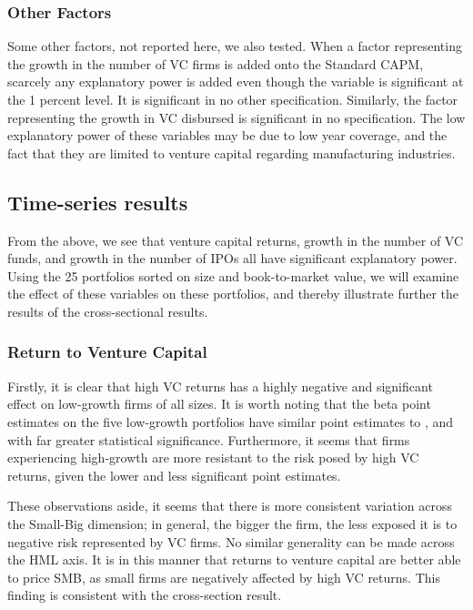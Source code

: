 \documentclass[12pt]{article}
\begin{document}
	\subsubsection{Other Factors} 

	Some other factors, not reported here, we also tested. When a factor representing the growth in the number of VC firms is added onto the Standard CAPM,  scarcely any explanatory power is added even though the variable is significant at the 1 percent level. It is significant in no other specification. Similarly, the factor representing the growth in VC disbursed is significant in no specification. The low explanatory power of these variables may be due to low year coverage, and the fact that they are limited to venture capital regarding manufacturing industries.

\subsection{Time-series results}

From the above, we see that venture capital returns, growth in the number of VC funds, and growth in the number of IPOs all have significant explanatory power. Using the 25 portfolios sorted on size and book-to-market value, we will examine the effect of these variables on these portfolios, and thereby illustrate further the results of the cross-sectional results.

	\subsubsection{Return to Venture Capital}
	
	Firstly, it is clear that high VC returns has a highly negative and significant effect on low-growth firms of all sizes. It is worth noting that the beta point estimates on the five low-growth portfolios have similar point estimates to \cite{grammig2010}, and with far greater statistical significance. Furthermore, it seems that firms experiencing high-growth are more resistant to the risk posed by high VC returns, given the lower and less significant point estimates.

These observations aside, it seems that there is more consistent variation across the Small-Big dimension; in general, the bigger the firm, the less exposed it is to negative risk represented by VC firms. No similar generality can be made across the HML axis. It is in this manner that returns to venture capital are better able to price SMB, as small firms are negatively affected by high VC returns. This finding is consistent with the cross-section result.
	
\end{document}
